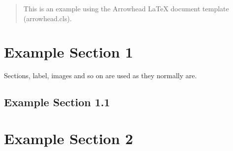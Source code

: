\documentclass[a4paper]{arrowhead}
\begin{document}
\ArrowheadDate{\today}
\ArrowheadSetup

\begin{center}
  \vspace*{1cm}
  \huge{\arrowtitle}

  \vspace*{0.2cm}
  \LARGE{\arrowtype}
  \vspace*{1cm}
  \vspace*{\fill}


  \vspace*{1cm}
  \vspace*{\fill}

  \begin{abstract}
    This is an example using the Arrowhead LaTeX document template (arrowhead.cls).
  \end{abstract}

  \vspace*{1cm}
\end{center}
\newpage

\tableofcontents
\newpage

\section{Example Section 1}

Sections, label, images and so on are used as they normally are.

\subsection{Example Section 1.1}

\newpage

\section{Example Section 2}

\newpage
\end{document}
